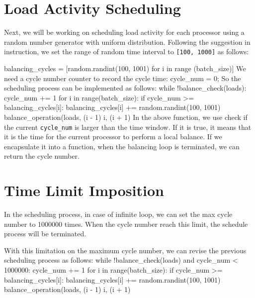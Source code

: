 \documentclass{article}%
\newenvironment{code}%
   {\snugshade\verbatim}%
   {\endverbatim\endsnugshade}
\begin{document}
\section{Load Activity Scheduling}
\begin{Large}
Next, we will be working on scheduling load activity for each processor using a random number generator with uniform distribution. Following the suggestion in instruction, we set the range of random time interval to \texttt{[100, 1000]} as follows:

\begin{code}
    balancing_cycles = [random.randint(100, 1001) 
                        for i in range (batch_size)]
\end{code}
We need a cycle number counter to record the cycle time:
\begin{code}
    cycle_num = 0;
\end{code}
So the scheduling process can be implemented as follows:
\begin{code}
    while !balance_check(loads):
        cycle_num += 1
        for i in range(batch_size):
            if cycle_num >= balancing_cycles[i]:
                balancing_cycles[i] += random.randint(100, 1001)
                balance_operation(loads, (i - 1) %
                                      i, (i + 1) %
\end{code}
In the above function, we use check if the current \texttt{cycle\_num} is larger than the time window. If it is true, it means that it is the time for the current processor to perform a local balance. If we encapsulate it into a function, when the balancing loop is terminated, we can return the cycle number.

\end{Large}

\section{Time Limit Imposition}
\begin{Large}
In the scheduling process, in case of infinite loop, we can set the max cycle number to 1000000 times. When the cycle number reach this limit, the schedule process will be terminated. 
\newpage

With this limitation on the maximum cycle number, we can revise the previous scheduling process as follows:
\begin{code}
    while !balance_check(loads) and cycle_num < 1000000:
        cycle_num += 1
        for i in range(batch_size):
            if cycle_num >= balancing_cycles[i]:
                balancing_cycles[i] += random.randint(100, 1001)
                balance_operation(loads, (i - 1) %
                                      i, (i + 1) %
\end{code}

\end{Large}
\end{document}

